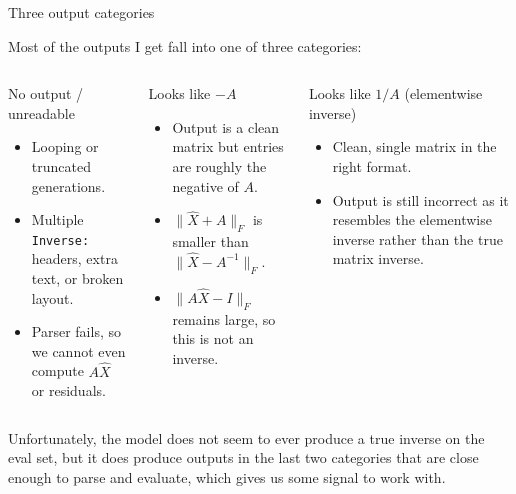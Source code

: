 \documentclass[aspectratio=169,professionalfonts]{beamer}
\begin{document}
\begin{frame}{Three output categories}

    
Most of the outputs I get fall into one of three categories: 

\begin{columns}[T,totalwidth=\textwidth]

\begin{block}{No output / unreadable}
\begin{itemize}[itemsep=0.45em]
  \item Looping or truncated generations.
  \item Multiple \texttt{Inverse:} headers, extra text, or broken layout.
  \item Parser fails, so we cannot even compute $A\hat{X}$ or residuals.
\end{itemize}
\end{block}

\begin{block}{Looks like $-A$}
\begin{itemize}[itemsep=0.45em]
  \item Output is a clean matrix but entries are roughly the negative of $A$.
  \item $\|\hat{X}+A\|_F$ is smaller than $\|\hat{X}-A^{-1}\|_F$.
  \item $ \|A\hat{X}-I\|_F$ remains large, so this is not an inverse.
\end{itemize}
\end{block}

\begin{block}{Looks like $1/A$ (elementwise inverse)}
\begin{itemize}[itemsep=0.45em]
  \item Clean, single matrix in the right format.
  \item Output is still incorrect as it resembles the elementwise inverse rather than the true matrix inverse.
\end{itemize}
\end{block}

\end{columns}

\vspace{0.8em}

Unfortunately, the model does not seem to ever produce a true inverse on the eval set, but it does produce outputs in the last two categories that are close enough to parse and evaluate, which gives us some signal to work with.

\end{frame}
\end{document}
